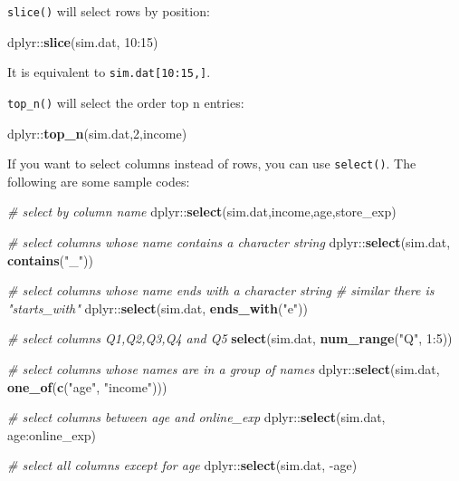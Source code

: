 \documentclass[]{book}
\newenvironment{Shaded}{\begin{snugshade}}{\end{snugshade}}
\newcommand{\KeywordTok}[1]{\textcolor[rgb]{0.13,0.29,0.53}{\textbf{{#1}}}}
\newcommand{\DecValTok}[1]{\textcolor[rgb]{0.00,0.00,0.81}{{#1}}}
\newcommand{\StringTok}[1]{\textcolor[rgb]{0.31,0.60,0.02}{{#1}}}
\newcommand{\CommentTok}[1]{\textcolor[rgb]{0.56,0.35,0.01}{\textit{{#1}}}}
\newcommand{\NormalTok}[1]{{#1}}
\theoremstyle{definition}
\theoremstyle{definition}
\theoremstyle{remark}
\begin{document}
\texttt{slice()} will select rows by position:

\begin{Shaded}
\begin{Highlighting}[]
\NormalTok{dplyr::}\KeywordTok{slice}\NormalTok{(sim.dat, }\DecValTok{10}\NormalTok{:}\DecValTok{15}\NormalTok{) }
\end{Highlighting}
\end{Shaded}

It is equivalent to \texttt{sim.dat{[}10:15,{]}}.

\texttt{top\_n()} will select the order top n entries:

\begin{Shaded}
\begin{Highlighting}[]
\NormalTok{dplyr::}\KeywordTok{top_n}\NormalTok{(sim.dat,}\DecValTok{2}\NormalTok{,income)}
\end{Highlighting}
\end{Shaded}

If you want to select columns instead of rows, you can use
\texttt{select()}. The following are some sample codes:

\begin{Shaded}
\begin{Highlighting}[]
\CommentTok{# select by column name}
\NormalTok{dplyr::}\KeywordTok{select}\NormalTok{(sim.dat,income,age,store_exp)}

\CommentTok{# select columns whose name contains a character string}
\NormalTok{dplyr::}\KeywordTok{select}\NormalTok{(sim.dat, }\KeywordTok{contains}\NormalTok{(}\StringTok{"_"}\NormalTok{))}

\CommentTok{# select columns whose name ends with a character string}
\CommentTok{# similar there is "starts_with"}
\NormalTok{dplyr::}\KeywordTok{select}\NormalTok{(sim.dat, }\KeywordTok{ends_with}\NormalTok{(}\StringTok{"e"}\NormalTok{))}

\CommentTok{# select columns Q1,Q2,Q3,Q4 and Q5}
\KeywordTok{select}\NormalTok{(sim.dat, }\KeywordTok{num_range}\NormalTok{(}\StringTok{"Q"}\NormalTok{, }\DecValTok{1}\NormalTok{:}\DecValTok{5}\NormalTok{)) }

\CommentTok{# select columns whose names are in a group of names}
\NormalTok{dplyr::}\KeywordTok{select}\NormalTok{(sim.dat, }\KeywordTok{one_of}\NormalTok{(}\KeywordTok{c}\NormalTok{(}\StringTok{"age"}\NormalTok{, }\StringTok{"income"}\NormalTok{)))}

\CommentTok{# select columns between age and online_exp}
\NormalTok{dplyr::}\KeywordTok{select}\NormalTok{(sim.dat, age:online_exp)}

\CommentTok{# select all columns except for age}
\NormalTok{dplyr::}\KeywordTok{select}\NormalTok{(sim.dat, -age)}
\end{Highlighting}
\end{Shaded}
\end{document}
